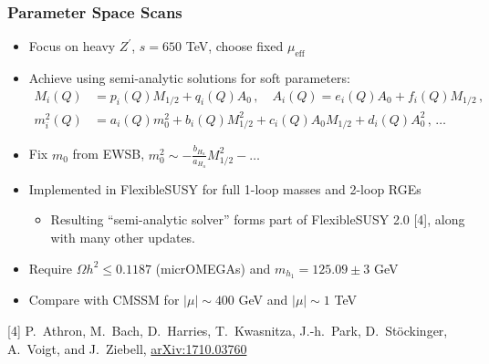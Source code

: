 \documentclass[10pt,aspectratio=169]{beamer}
\begin{document}
\begin{frame}
  \frametitle{Parameter Space Scans}
  \begin{itemize}\itemsep1em
    \item Focus on heavy $Z^\prime$, $s = 650$ TeV, choose fixed
      $\mu_{\text{eff}}$
    \item Achieve using semi-analytic solutions for soft parameters:
      \begin{align*}
        M_i(Q) &= p_i(Q) M_{1/2} + q_i(Q) A_0 \, , \quad
        A_i(Q) = e_i(Q) A_0 + f_i(Q) M_{1/2} \, , \\
        m_i^2(Q) &= a_i(Q) m_0^2 + b_i(Q) M_{1/2}^2 + c_i(Q) A_0 M_{1/2}
        + d_i(Q) A_0^2 \, , \, \ldots
      \end{align*}
    \item Fix $m_0$ from EWSB,
      $m_0^2 \sim -\frac{b_{H_u}}{a_{H_u}} M_{1/2}^2 - \ldots$
    \item Implemented in FlexibleSUSY for {\color{blue} full 1-loop masses
      and 2-loop RGEs}
      \begin{itemize}
      \item Resulting ``semi-analytic solver'' forms part of
        FlexibleSUSY 2.0 [4], along with many other updates.
      \end{itemize}
    \item Require $\Omega h^2 \leq 0.1187$ (micrOMEGAs) and
      $m_{h_1} = 125.09 \pm 3$ GeV
    \item Compare with CMSSM for $|\mu| \sim 400$ GeV and $|\mu| \sim
      1$ TeV
  \end{itemize}
  \vfill
      {\tiny [4] P.~Athron, M.~Bach, D.~Harries, T.~Kwasnitza,
        J.-h.~Park, D.~St\"{o}ckinger, A.~Voigt, and J.~Ziebell,
        \href{http://arxiv.org/abs/1710.03760}{arXiv:1710.03760}
      }
\end{frame}
\end{document}
